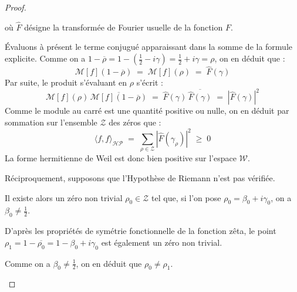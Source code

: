 \documentclass[Riemann_Hypothesis.tex]{subfiles}
\begin{document}
\begin{proof}
\begin{part_proof}
\begin{equation*}
        \end{equation*}
        où $\hat{F}$ désigne la transformée de Fourier usuelle de la fonction $F$. \par
        Évaluons à présent le terme conjugué apparaissant dans la somme de la formule explicite. Comme on a $1 - \overline{\rho} = 1 - \left( \frac{1}{2} - i\gamma \right) = \frac{1}{2} + i\gamma = \rho$, on en déduit que :
        \begin{equation*}
            \mathcal{M}[f](1 - \overline{\rho}) \;=\; \mathcal{M}[f](\rho) \;=\; \hat{F}(\gamma)
        \end{equation*}
        Par suite, le produit s'évaluant en $\rho$ s'écrit :
        \begin{equation*}
            \mathcal{M}[f](\rho) \, \overline{\mathcal{M}[f](1 - \overline{\rho})} \;=\; \hat{F}(\gamma) \, \overline{\hat{F}(\gamma)} \;=\; \left| \hat{F}(\gamma) \right|^2
        \end{equation*}
        Comme le module au carré est une quantité positive ou nulle, on en déduit par sommation sur l'ensemble $\mathcal{Z}$ des zéros que :
        \begin{equation*}
            \langle f, f \rangle_{\mathcal{HP}} \;=\; \sum_{\rho \in \mathcal{Z}} \left| \hat{F}(\gamma_\rho) \right|^2 \;\geq\; 0
        \end{equation*}
        La forme hermitienne de Weil est donc bien positive sur l'espace $\mathcal{W}$.
    \end{part_proof}

    \begin{part_proof}
        Réciproquement, supposons que l'Hypothèse de Riemann n'est pas vérifiée. \par
        Il existe alors un zéro non trivial $\rho_0 \in \mathcal{Z}$ tel que, si l'on pose $\rho_0 = \beta_0 + i\gamma_0$, on a $\beta_0 \neq \frac{1}{2}$. \par
        D'après les propriétés de symétrie fonctionnelle de la fonction zêta, le point $\rho_1 = 1 - \overline{\rho_0} = 1 - \beta_0 + i\gamma_0$ est également un zéro non trivial. \par
        Comme on a $\beta_0 \neq \frac{1}{2}$, on en déduit que $\rho_0 \neq \rho_1$. \medskip\par


\end{part_proof}
\end{proof}
\end{document}
